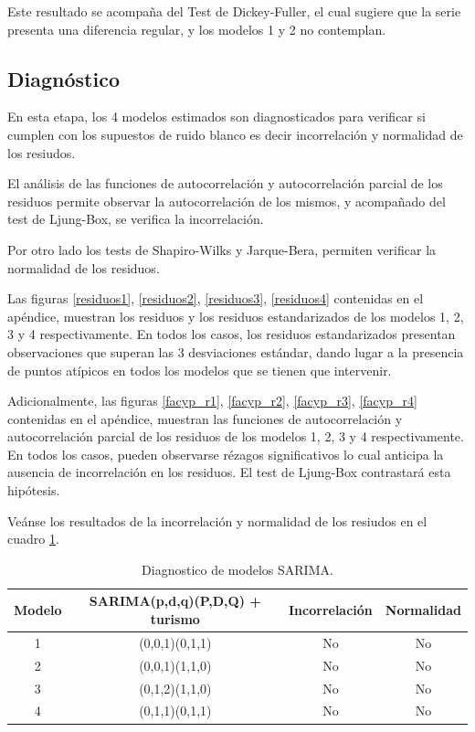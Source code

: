 \documentclass[
  12pt,
]{article}
\begin{document}
Este resultado se acompaña del Test de Dickey-Fuller, el cual sugiere
que la serie presenta una diferencia regular, y los modelos 1 y 2 no
contemplan.

\hypertarget{diagnuxf3stico}{%
\subsection{Diagnóstico}\label{diagnuxf3stico}}

En esta etapa, los 4 modelos estimados son diagnosticados para verificar
si cumplen con los supuestos de ruido blanco es decir incorrelación y
normalidad de los resiudos.

El análisis de las funciones de autocorrelación y autocorrelación
parcial de los residuos permite observar la autocorrelación de los
mismos, y acompañado del test de Ljung-Box, se verifica la
incorrelación.

Por otro lado los tests de Shapiro-Wilks y Jarque-Bera, permiten
verificar la normalidad de los residuos.

Las figuras \ref{residuos1}, \ref{residuos2}, \ref{residuos3},
\ref{residuos4} contenidas en el apéndice, muestran los residuos y los
residuos estandarizados de los modelos 1, 2, 3 y 4 respectivamente. En
todos los casos, los residuos estandarizados presentan observaciones que
superan las 3 desviaciones estándar, dando lugar a la presencia de
puntos atípicos en todos los modelos que se tienen que intervenir.

Adicionalmente, las figuras \ref{facyp_r1}, \ref{facyp_r2},
\ref{facyp_r3}, \ref{facyp_r4} contenidas en el apéndice, muestran las
funciones de autocorrelación y autocorrelación parcial de los residuos
de los modelos 1, 2, 3 y 4 respectivamente. En todos los casos, pueden
observarse rézagos significativos lo cual anticipa la ausencia de
incorrelación en los residuos. El test de Ljung-Box contrastará esta
hipótesis.

Veánse los resultados de la incorrelación y normalidad de los resiudos
en el cuadro \ref{tab:diagnostico}.

\begin{table}[H]
\centering
\begin{tabular}{c c c c}
\hline
Modelo & SARIMA(p,d,q)(P,D,Q) + turismo & Incorrelación & Normalidad \\ \hline
1 & (0,0,1)(0,1,1) & No & No \\ 
2 & (0,0,1)(1,1,0) & No & No \\ 
3 & (0,1,2)(1,1,0) & No & No \\ 
4 & (0,1,1)(0,1,1) & No & No \\ \hline
\end{tabular}
\caption{Diagnostico de modelos SARIMA.}
\label{tab:diagnostico}
\end{table}
\end{document}
